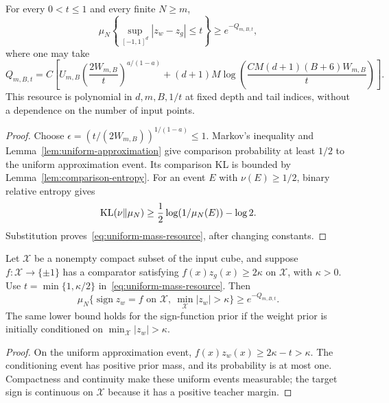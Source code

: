 \begin{theorem}
\label{thm:uniform-mass}
For every $0<t\le1$ and every finite $N\ge m$,
\begin{equation}
 \mu_N\left\{\sup_{[-1,1]^d}|z_w-z_g|\le t\right\}
 \ge e^{-Q_{m,B,t}},
 \label{eq:uniform-mass}
\end{equation}
where one may take
\begin{equation}
 Q_{m,B,t}
 =C\left[
 U_{m,B}\left(\frac{2W_{m,B}}t\right)^{a/(1-a)}
 +(d+1)M\log\!\left(
 \frac{CM(d+1)(B+6)W_{m,B}}t\right)\right].
 \label{eq:uniform-mass-resource}
\end{equation}
This resource is polynomial in $d,m,B,1/t$ at fixed depth and tail indices, without a dependence on the number of input points.
\end{theorem}
\begin{proof}
Choose $\epsilon=(t/(2W_{m,B}))^{1/(1-a)}\le1$. Markov's inequality and Lemma~\ref{lem:uniform-approximation} give comparison probability at least $1/2$ to the uniform approximation event. Its comparison KL is bounded by Lemma~\ref{lem:comparison-entropy}. For an event $E$ with $\nu(E)\ge1/2$, binary relative entropy gives
\[
 \operatorname{KL}(\nu\|\mu_N)\ge\frac12\log(1/\mu_N(E))-\log2.
\]
Substitution proves~\eqref{eq:uniform-mass-resource}, after changing constants.
\end{proof}

\begin{corollary}
\label{cor:sign-mass}
Let $\mathcal X$ be a nonempty compact subset of the input cube, and suppose
$f:\mathcal X\to\{\pm1\}$ has a comparator satisfying
$f(x)z_g(x)\ge2\kappa$ on $\mathcal X$, with $\kappa>0$.
Use $t=\min\{1,\kappa/2\}$ in~\eqref{eq:uniform-mass-resource}. Then
\[
 \mu_N\{\operatorname{sign}z_w=f\text{ on }\mathcal X,\ 
                      \min_{\mathcal X}|z_w|>\kappa\}
 \ge e^{-Q_{m,B,t}}.
\]
The same lower bound holds for the sign-function prior if the weight prior is initially conditioned on $\min_{\mathcal X}|z_w|>\kappa$.
\end{corollary}
\begin{proof}
On the uniform approximation event, $f(x)z_w(x)\ge2\kappa-t>\kappa$.
The conditioning event has positive prior mass, and its probability is at most one. Compactness and continuity make these uniform events measurable; the target sign is continuous on $\mathcal X$ because it has a positive teacher margin.
\end{proof}

